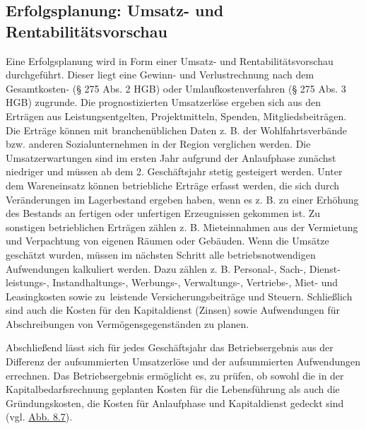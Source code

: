 \documentclass[
  letterpaper,
]{book}
\begin{document}
\subsection{Erfolgsplanung: Umsatz- und
Rentabilitätsvorschau}\label{erfolgsplanung-umsatz-und-rentabilittsvorschau}

Eine Erfolgsplanung wird in Form einer Umsatz- und Rentabilitätsvorschau
durchgeführt. Dieser liegt eine Gewinn- und Verlustrechnung nach dem
Gesamtkosten- (§ 275 Abs. 2 HGB) oder Umlaufkostenverfahren (§ 275 Abs.
3 HGB) zugrunde. Die prognostizierten Umsatzerlöse ergeben sich aus den
Erträgen aus Leistungsentgelten, Projektmitteln, Spenden,
Mitgliedsbeiträgen. Die Erträge können mit branchenüblichen Daten z. B.
der Wohlfahrtsverbände bzw. anderen Sozialunternehmen in der Region
verglichen werden. Die Umsatzerwartungen sind im ersten Jahr aufgrund
der Anlaufphase zunächst niedriger und müssen ab dem 2. Geschäftsjahr
stetig gesteigert werden. Unter dem Wareneinsatz können betriebliche
Erträge erfasst werden, die sich durch Veränderungen im Lagerbestand
ergeben haben, wenn es z. B. zu einer Erhöhung des Bestands an fertigen
oder unfertigen Erzeugnissen gekommen ist. Zu sonstigen betrieblichen
Erträgen zählen z. B. Mieteinnahmen aus der Vermietung und Verpachtung
von eigenen Räumen oder Gebäuden. Wenn die Umsätze geschätzt wurden,
müssen im nächsten Schritt alle betriebsnotwendigen Aufwendungen
kalkuliert werden. Dazu zählen z. B. Personal-, Sach-, Dienst-
leistungs-, Instandhaltungs-, Werbungs-, Verwaltungs-, Vertriebs-, Miet-
und Leasingkosten sowie zu~leistende Versicherungsbeiträge und Steuern.
Schließlich sind auch die Kosten für den Kapitaldienst (Zinsen) sowie
Aufwendungen für Abschreibungen von Vermögensgegenständen zu planen.

Abschließend lässt sich für jedes Geschäftsjahr das Betriebsergebnis aus
der Differenz der aufsummierten Umsatzerlöse und der aufsummierten
Aufwendungen errechnen. Das Betriebsergebnis ermöglicht es, zu prüfen,
ob sowohl die in der Kapitalbedarfsrechnung geplanten Kosten für die
Lebensführung als auch die Gründungskosten, die Kosten für Anlaufphase
und Kapitaldienst gedeckt sind (vgl. \hyperref[figure87]{Abb. 8.7}).
\end{document}
